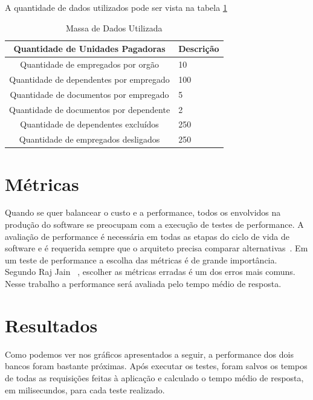 A quantidade de dados utilizados pode ser vista na tabela \ref{tab:massadadosutil}

\begin{table}
	\caption{Massa de Dados Utilizada}
	\begin{center}
	\begin{tabularx}{\textwidth}{ | c | X | }
	\hline
		\textbf{Quantidade de Unidades Pagadoras} & \multicolumn{1}{c|}{\textbf{Descrição}} \\
	\hline
		Quantidade de empregados por orgão & 10\\
	\hline 
		Quantidade de dependentes por empregado & 100 \\
	\hline
		Quantidade de documentos por empregado & 5\\
	\hline
		Quantidade de documentos por dependente & 2\\
	\hline
		Quantidade de dependentes excluídos & 250\\
	\hline
		Quantidade de empregados desligados & 250\\
	\hline
	\end {tabularx}
	\end{center}
	\label{tab:massadadosutil}
\end{table}

\section{Métricas}

Quando se quer balancear o custo e a performance, todos os envolvidos na produção do software se preocupam com a execução de testes de performance. A avaliação de performance é necessária em todas as etapas do ciclo de vida de software e é requerida sempre que o arquiteto precisa comparar alternativas~\cite{rajjain}. Em um teste de performance a escolha das métricas é de grande importância. Segundo Raj Jain ~\cite{rajjain}, escolher as métricas erradas é um dos erros mais comuns. Nesse trabalho a performance será avaliada pelo tempo médio de resposta.

\section{Resultados}

Como podemos ver nos gráficos apresentados a seguir, a performance dos dois bancos foram bastante próximas. Após executar os testes, foram salvos os tempos de todas as requisições feitas à aplicação e calculado o tempo médio de resposta, em milisecundos, para cada teste realizado.

